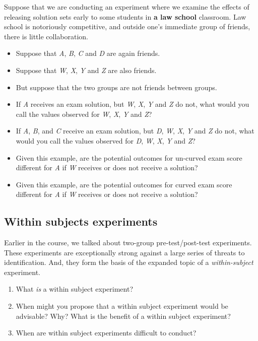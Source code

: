 \documentclass[
]{article}
\providecommand{\tightlist}{%
  \setlength{\itemsep}{0pt}\setlength{\parskip}{0pt}}
\theoremstyle{definition}
\theoremstyle{definition}
\theoremstyle{definition}
\theoremstyle{definition}
\theoremstyle{remark}
\begin{document}
Suppose that we are conducting an experiment where we examine the effects of releasing solution sets early to some students in \textbf{a law school} classroom. Law school is notoriously competitive, and outside one's immediate group of friends, there is little collaboration.

\begin{itemize}
\item
  Suppose that \emph{A}, \emph{B}, \emph{C} and \emph{D} are again friends.
\item
  Suppose that \emph{W}, \emph{X}, \emph{Y} and \emph{Z} are also friends.
\item
  But suppose that the two groups are not friends between groups.
\item
  If \emph{A} receives an exam solution, but \emph{W}, \emph{X}, \emph{Y} and \emph{Z} do not, what would you call the values observed for \emph{W}, \emph{X}, \emph{Y} and \emph{Z}?
\item
  If \emph{A}, \emph{B}, and \emph{C} receive an exam solution, but \emph{D}, \emph{W}, \emph{X}, \emph{Y} and \emph{Z} do not, what would you call the values observed for \emph{D}, \emph{W}, \emph{X}, \emph{Y} and \emph{Z}?
\item
  Given this example, are the potential outcomes for un-curved exam score different for \emph{A} if \emph{W} receives or does not receive a solution?
\item
  Given this example, are the potential outcomes for curved exam score different for \emph{A} if \emph{W} receives or does not receive a solution?
\end{itemize}

\subsection{Within subjects experiments}\label{within-subjects-experiments}

Earlier in the course, we talked about two-group pre-test/post-test experiments. These experiments are exceptionally strong against a large series of threats to identification. And, they form the basis of the expanded topic of a \emph{within-subject} experiment.

\begin{enumerate}
\def\labelenumi{\arabic{enumi}.}
\tightlist
\item
  What \emph{is} a within subject experiment?
\item
  When might you propose that a within subject experiment would be advisable? Why? What is the benefit of a within subject experiment?
\item
  When are within subject experiments difficult to conduct?
\end{enumerate}
\end{document}
